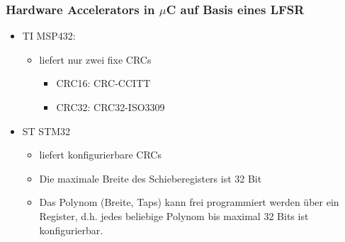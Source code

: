 \subsubsection{Hardware Accelerators in $\mu$C auf Basis eines LFSR}
\begin{itemize}
	\item TI MSP432:
	\begin{itemize}
		\item liefert nur zwei fixe CRCs
		\begin{itemize}
			\item CRC16: CRC-CCITT
			\item CRC32: CRC32-ISO3309
		\end{itemize}
	\end{itemize}
	\item ST STM32
	\begin{itemize}
		\item liefert konfigurierbare CRCs
		\item Die maximale Breite des Schieberegisters ist 32 Bit
		\item Das Polynom (Breite, Taps) kann frei programmiert werden über ein Register, d.h. jedes beliebige Polynom bis maximal 32 Bits ist konfigurierbar.
	\end{itemize}
\end{itemize}
